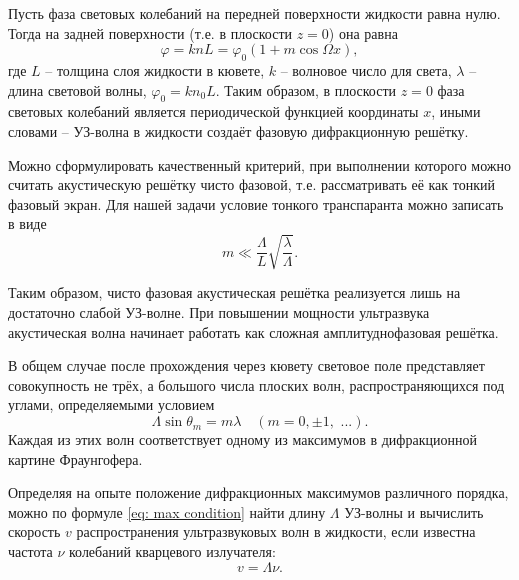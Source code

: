 \documentclass[a4paper,12pt]{article}
\begin{document}
Пусть фаза световых колебаний на передней поверхности жидкости равна нулю. Тогда на задней поверхности (т.е. в плоскости $z = 0$) она
равна
\begin{equation}\label{eq: delta_phi(x)}
    \varphi = k n L = \varphi_0(1 + m\cos\Omega x),
\end{equation}
где $L$ -- толщина слоя жидкости в кювете, $k$ -- волновое число для света, $\lambda$ -- длина световой волны, $\varphi_0 = k n_0 L$. Таким образом,
в плоскости $z = 0$ фаза световых колебаний является периодической функцией координаты $x$, иными словами -- УЗ-волна в жидкости создаёт фазовую дифракционную решётку.

Можно сформулировать качественный критерий, при выполнении которого можно считать акустическую решётку чисто фазовой, т.е. рассматривать её как тонкий фазовый экран. Для нашей задачи условие тонкого транспаранта можно записать в виде
\begin{equation}\label{eq: thin transarent condition}
    m \ll \frac{\Lambda}{L} \sqrt{\frac{\lambda}{\Lambda}}.
\end{equation}

Таким образом, чисто фазовая акустическая решётка реализуется лишь на достаточно слабой УЗ-волне. При повышении мощности ультразвука акустическая волна начинает работать как сложная амплитуднофазовая решётка.

В общем случае после прохождения через кювету световое поле представляет
совокупность не трёх, а большого числа плоских волн, распространяющихся под углами, определяемыми условием
\begin{equation}\label{eq: max condition}
    \Lambda \sin\theta_m = m\lambda \quad (m = 0, \pm 1, \text{ ...}).
\end{equation}
Каждая из этих волн соответствует одному из максимумов в дифракционной картине Фраунгофера.

Определяя на опыте положение дифракционных максимумов различного порядка, можно по формуле \eqref{eq: max condition} найти длину $\Lambda$ УЗ-волны и
вычислить скорость $v$ распространения ультразвуковых волн в жидкости, если известна частота $\nu$ колебаний кварцевого излучателя:
\begin{equation}\label{eq: wave's velocity}
    v = \Lambda\nu.
\end{equation}
\end{document}
